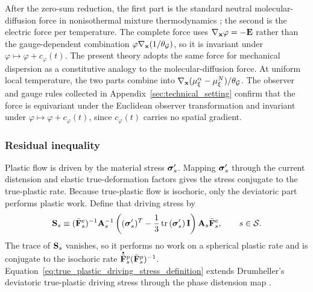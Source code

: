 %
After the zero-sum reduction, the first part is the standard neutral
molecular-diffusion force in nonisothermal mixture thermodynamics
\cite{bothe2015continuum,bothe2023diffusion_fluxes}; the second is the electric
force per temperature.  The complete force uses \(\nabla_{\mathbf{x}}\varphi=-\mathbf{E}\)
rather than the gauge-dependent combination
\(\varphi\nabla_{\mathbf{x}}(1/\theta_{\mathcal{G}})\), so it is invariant under
\(\varphi\mapsto\varphi+c_\varphi(t)\).  The present theory adopts the same
force for mechanical dispersion as a constitutive analogy to the
molecular-diffusion force.  At uniform local temperature, the two parts combine
into \(\nabla_{\mathbf{x}}(\mu_\xi^\alpha-\mu_\xi^N)/\theta_{\mathcal{G}}\).
The observer and gauge rules collected in
Appendix~\ref{sec:technical_setting} confirm that the force is equivariant
under the Euclidean observer transformation and invariant under
\(\varphi\mapsto\varphi+c_\varphi(t)\), since \(c_\varphi(t)\) carries no
spatial gradient.

\subsubsection{Residual inequality}
\label{sec:MC_residual_inequality}

Plastic flow is driven by the material stress \(\boldsymbol{\sigma}_s'\).  Mapping \(\boldsymbol{\sigma}_s'\) through
the current distension and elastic true-deformation factors gives the stress
conjugate to the true-plastic rate.  Because true-plastic flow is isochoric, only
the deviatoric part performs plastic work.  Define that driving stress by
%
\begin{equation}
	\mathbf{S}_s
	\equiv
	(\bar{\mathbf{F}}_s^e)^{-1}
	\mathbf{A}_s^{-1}
	\left(
	(\boldsymbol{\sigma}_s')^T
	-\frac{1}{3}
	\operatorname{tr}\left(
	\boldsymbol{\sigma}_s'
	\right)\mathbf{I}
	\right)
	\mathbf{A}_s
	\bar{\mathbf{F}}_s^e,
	\qquad
	s\in\mathcal{S}.
	\label{eq:true_plastic_driving_stress_definition}
\end{equation}
%
The trace of \(\mathbf{S}_s\) vanishes, so it performs no work on a spherical
plastic rate and is conjugate to the isochoric rate
\(\phasedot{\bar{\mbf F}}_s^p(\bar{\mbf F}_s^p)^{-1}\).
Equation~\eqref{eq:true_plastic_driving_stress_definition} extends
Drumheller's deviatoric true-plastic driving stress through the phase distension
map
\cite[eqs.~(108)--(112)]{drumheller2000}.

